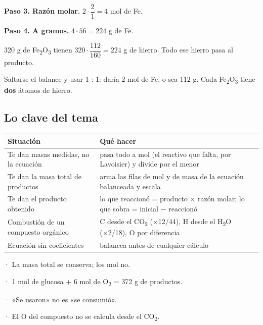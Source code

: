 

\textbf{Paso 3. Razón molar.} $2\cdot\dfrac{2}{1} = 4$ mol de Fe.

 

\textbf{Paso 4. A gramos.} $4\cdot 56 = 224$ g de Fe.

  
\begin{clave} 320 g de Fe\textsubscript{2}O\textsubscript{3} tienen $320\cdot\dfrac{112}{160} = 224$ g de hierro. Todo ese hierro pasa al producto. \end{clave}
 
\begin{ojo} Saltarse el balance y usar 1 : 1: daría 2 mol de Fe, o sea 112 g. Cada Fe\textsubscript{2}O\textsubscript{3} tiene \textbf{dos} átomos de hierro.\end{ojo}
\subsection{Lo clave del tema}
\begin{center}\small
\begin{tabularx}{\linewidth}{@{}>{\raggedright\arraybackslash\hsize=0.95\hsize}X>{\raggedright\arraybackslash\hsize=1.05\hsize}X@{}}
\toprule
\textbf{Situación} & \textbf{Qué hacer} \\
\midrule
Te dan masas medidas, no la ecuación & pasa todo a mol (el reactivo que falta, por Lavoisier) y divide por el menor \\
Te dan la masa total de productos & arma las filas de mol y de masa de la ecuación balanceada y escala \\
Te dan el producto obtenido & lo que reaccionó = producto × razón molar; lo que sobra = inicial \ensuremath{-} reaccionó \\
Combustión de un compuesto orgánico & C desde el CO\textsubscript{2} (×12/44), H desde el H\textsubscript{2}O (×2/18), O por diferencia \\
Ecuación sin coeficientes & balancea antes de cualquier cálculo \\
\bottomrule
\end{tabularx}
\end{center}
  
\begin{clave}[{Recuerda}] · La masa total se conserva; los mol no.\par · 1 mol de glucosa + 6 mol de O\textsubscript{2} = 372 g de productos.\par · «Se usaron» no es «se consumió».\par · El O del compuesto no se calcula desde el CO\textsubscript{2}.\end{clave}
  
